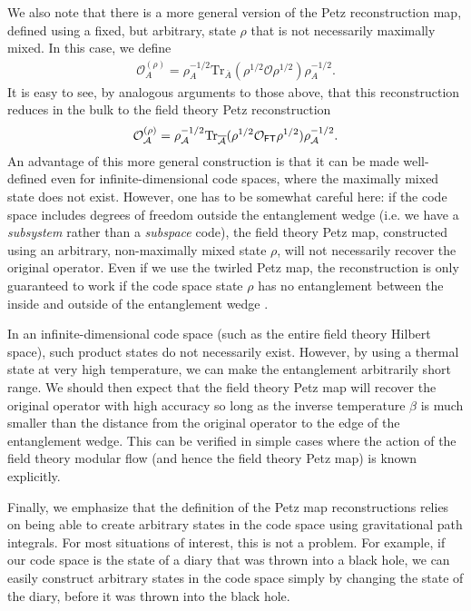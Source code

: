 \documentclass[11pt]{article}
\numberwithin{equation}{section}
\def\tr{\text{Tr}}
\begin{document}
We also note that there is a more general version of the Petz reconstruction map, defined using a fixed, but arbitrary, state $\rho$ that is not necessarily maximally mixed. In this case, we define
\begin{align}
\mathcal{O}_A^{(\rho)} =\rho_A^{-1/2}\tr_{\overline A}(\rho^{1/2} \mathcal{O} \rho^{1/2})\rho_A^{-1/2}.
\end{align}
It is easy to see, by analogous arguments to those above, that this reconstruction reduces in the bulk to the field theory Petz reconstruction
\begin{align}
\mathcal{O}_{\mathcal{A}}^{(\rho)} = \rho_{\mathcal{A}}^{-1/2} \tr_{\overline{\mathcal{A}}}(\rho^{1/2}\mathcal{O}_{\sf{FT}}\rho^{1/2})\rho_{\mathcal{A}}^{-1/2}.
\end{align}
An advantage of this more general construction is that it can be made well-defined even for infinite-dimensional code spaces, where the maximally mixed state does not exist. However, one has to be somewhat careful here: if the code space includes degrees of freedom outside the entanglement wedge (i.e. we have a \emph{subsystem} rather than a \emph{subspace} code), the field theory Petz map, constructed using an arbitrary, non-maximally mixed state $\rho$, will not necessarily recover the original operator. Even if we use the twirled Petz map, the reconstruction is only guaranteed to work if the code space state $\rho$ has no entanglement between the inside and outside of the entanglement wedge \cite{Cotler:2017erl}.

In an infinite-dimensional code space (such as the entire field theory Hilbert space), such product states do not necessarily exist. However, by using a thermal state at very high temperature, we can make the entanglement arbitrarily short range. We should then expect that the field theory Petz map will recover the original operator with high accuracy so long as the inverse temperature $\beta$ is much smaller than the distance from the original operator to the edge of the entanglement wedge. This can be verified in simple cases where the action of the field theory modular flow (and hence the field theory Petz map) is known explicitly.

Finally, we emphasize that the definition of the Petz map reconstructions relies on being able to create arbitrary states in the code space using gravitational path integrals. For most situations of interest, this is not a problem. For example, if our code space is the state of a diary that was thrown into a black hole, we can easily construct arbitrary states in the code space simply by changing the state of the diary, before it was thrown into the black hole.
\end{document}
